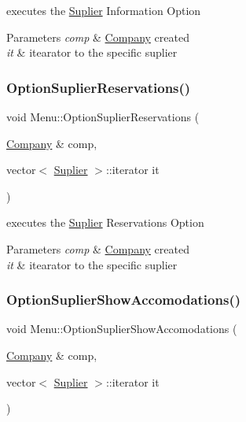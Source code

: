 executes the \hyperlink{class_suplier}{Suplier} Information Option 


\begin{DoxyParams}{Parameters}
{\em comp} & \hyperlink{class_company}{Company} created\\
\hline
{\em it} & itearator to the specific suplier \\
\hline
\end{DoxyParams}
\hypertarget{class_menu_a38833a562edc41574dcac2e888a9a56f}{}\label{class_menu_a38833a562edc41574dcac2e888a9a56f} 
\subsubsection{\texorpdfstring{Option\+Suplier\+Reservations()}{OptionSuplierReservations()}}
{\footnotesize\ttfamily void Menu\+::\+Option\+Suplier\+Reservations (\begin{DoxyParamCaption}\item[{\hyperlink{class_company}{Company} \&}]{comp,  }\item[{vector$<$ \hyperlink{class_suplier}{Suplier} $>$\+::iterator}]{it }\end{DoxyParamCaption})}



executes the \hyperlink{class_suplier}{Suplier} Reservations Option 


\begin{DoxyParams}{Parameters}
{\em comp} & \hyperlink{class_company}{Company} created\\
\hline
{\em it} & itearator to the specific suplier \\
\hline
\end{DoxyParams}
\hypertarget{class_menu_acd1b717ce9b7e5d2f65d5d6ac64b1513}{}\label{class_menu_acd1b717ce9b7e5d2f65d5d6ac64b1513} 
\subsubsection{\texorpdfstring{Option\+Suplier\+Show\+Accomodations()}{OptionSuplierShowAccomodations()}}
{\footnotesize\ttfamily void Menu\+::\+Option\+Suplier\+Show\+Accomodations (\begin{DoxyParamCaption}\item[{\hyperlink{class_company}{Company} \&}]{comp,  }\item[{vector$<$ \hyperlink{class_suplier}{Suplier} $>$\+::iterator}]{it }\end{DoxyParamCaption})}



